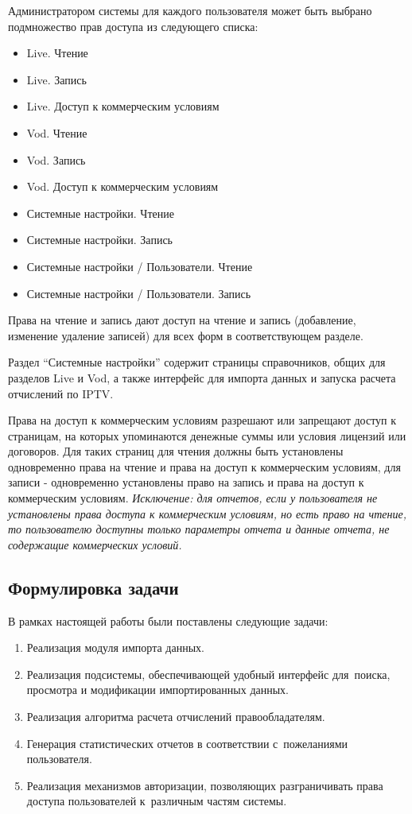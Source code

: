 Администратором системы для каждого пользователя может быть выбрано подмножество прав доступа из следующего списка:
\begin{itemize}
\item{
Live. Чтение
}
\item{
Live. Запись
}
\item{
Live. Доступ к коммерческим условиям
}
\item{
Vod. Чтение
}
\item{
Vod. Запись
}
\item{
Vod. Доступ к коммерческим условиям
}
\item{
Системные настройки. Чтение
}
\item{
Системные настройки. Запись
}
\item{
Системные настройки / Пользователи. Чтение
}
\item{
Системные настройки / Пользователи. Запись
}
\end{itemize}

Права на чтение и запись дают доступ на чтение и запись (добавление, изменение удаление записей) для всех форм в соответствующем разделе.

Раздел ``Системные настройки'' содержит страницы справочников, общих для разделов Live и Vod, а также интерфейс для
импорта данных и запуска расчета отчислений по IPTV.

Права на доступ к коммерческим условиям разрешают или запрещают доступ к страницам, на которых упоминаются денежные суммы 
или условия лицензий или договоров. Для таких страниц для чтения должны быть установлены одновременно права на чтение и 
права на доступ к коммерческим условиям, для записи - одновременно установлены право на запись и права на доступ к 
коммерческим условиям. \textit{Исключение: для отчетов, если у пользователя не установлены права доступа к коммерческим условиям, 
но есть право на чтение, то пользователю доступны только параметры отчета и данные отчета, не содержащие коммерческих условий.}

\subsection{Формулировка задачи}
В рамках настоящей работы были поставлены следующие задачи:

\begin{enumerate}
\item{
  Реализация модуля импорта данных.
}
\item{
  Реализация подсистемы, обеспечивающей удобный интерфейс для~поиска, просмотра и модификации импортированных данных.
}
\item{
  Реализация алгоритма расчета отчислений правообладателям. 
}
\item{
  Генерация статистических отчетов в соответствии с~пожеланиями пользователя.
}
\item{
  Реализация механизмов авторизации, позволяющих разграничивать права доступа пользователей к~различным частям системы.
}
\end{enumerate}

